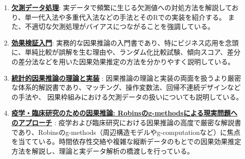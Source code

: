 \documentclass[uplatex]{jsarticle} %
\begin{document}
\begin{enumerate}
\item \href{https://www.kyoritsu-pub.co.jp/book/b10003896.html}{\textbf{欠測データ処理}}: 
実データで頻繁に生じる欠測値への対処方法を解説しており、単一代入法や多重代入法などの手法とそのRでの実装を紹介する。
また、不適切な欠測処理がバイアスにつながることを強調している。

\item \href{https://gihyo.jp/book/2020/978-4-297-11117-5}{\textbf{効果検証入門}}: 
実務的な因果推論の入門書であり、特にビジネス応用を念頭に、単純比較が誤解を生む理由や、ランダム化比較試験、傾向スコア、差分の差分法などを用いた因果効果推定の方法を分かりやすく説明している。

\item \href{https://www.kyoritsu-pub.co.jp/book/b10011781.html}{\textbf{統計的因果推論の理論と実装}} : 
因果推論の理論と実装の両面を扱うより厳密な体系的解説書であり、マッチング、操作変数法、回帰不連続デザインなどの手法や、
因果枠組みにおける欠測データの扱いについても説明している。

\item \href{https://www.amazon.co.jp/%E7%96%AB%E5%AD%A6%E3%83%BB%E8%87%A8%E5%BA%8A%E7%A0%94%E7%A9%B6%E3%81%AE%E3%81%9F%E3%82%81%E3%81%AE%E5%9B%A0%E6%9E%9C%E6%8E%A8%E8%AB%96-Robins%E3%81%AEg-methods%E3%81%AB%E3%82%88%E3%82%8B%E7%8F%BE%E5%AE%9F%E5%95%8F%E9%A1%8C%E3%81%B8%E3%81%AE%E3%82%A2%E3%83%97%E3%83%AD%E3%83%BC%E3%83%81-%E7%AF%A0%E5%B4%8E-%E6%99%BA%E5%A4%A7/dp/4254123124/}{\textbf{疫学・臨床研究のための因果推論: Robinsのg-methodsによる現実問題へのアプローチ}} :
疫学および臨床研究における因果推論の高度で厳密な解説書であり、Robinsのg-methods（周辺構造モデルやg-computationなど）に焦点を当てている。時間依存性交絡や複雑な縦断データのもとでの因果効果推定方法を解説し、理論と実データ解析の橋渡しを行っている。
\end{enumerate}
\end{document}
